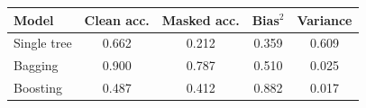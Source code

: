 \begin{tabular}{lcccc}
\toprule
Model & Clean acc. & Masked acc. & Bias$^2$ & Variance \\
\midrule
Single tree & 0.662 & 0.212 & 0.359 & 0.609 \\
Bagging & 0.900 & 0.787 & 0.510 & 0.025 \\
Boosting & 0.487 & 0.412 & 0.882 & 0.017 \\
\bottomrule
\end{tabular}
